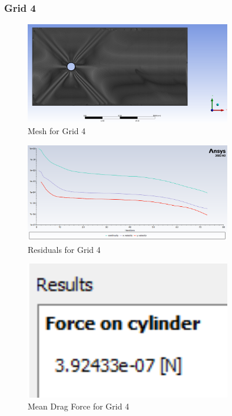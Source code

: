 \subsubsection*{Grid 4}
\begin{figure}[H]
    \centering
    \includegraphics[width=0.8\textwidth]{Questions/Figures/mesh with grid 4.png}
    \caption{Mesh for Grid 4}
\end{figure}
\begin{figure}[H]
    \centering
    \includegraphics[width=0.8\textwidth]{Questions/Figures/residuals grid 4.png}
    \caption{Residuals for Grid 4}
\end{figure}
\begin{figure}[H]
    \centering
    \includegraphics[width=0.8\textwidth]{Questions/Figures/force on cylinder grid 4.png}
    \caption{Mean Drag Force for Grid 4}
\end{figure}
